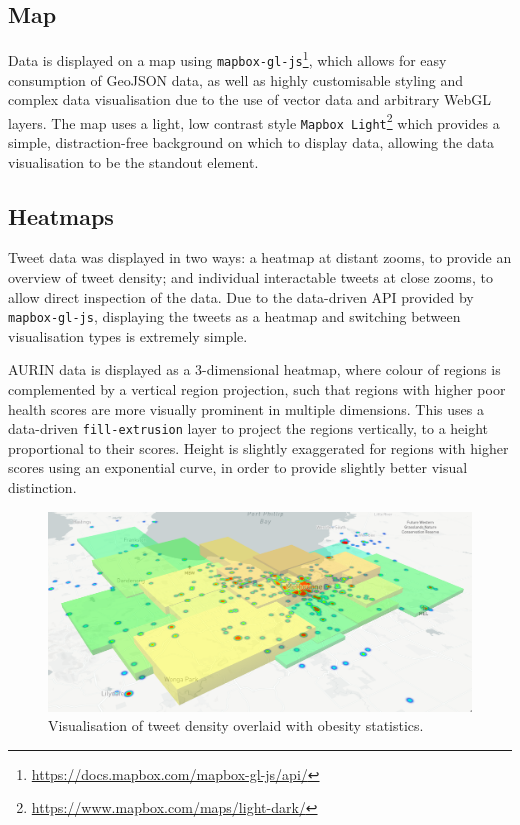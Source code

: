 \subsection{Map}

Data is displayed on a map using \texttt{mapbox-gl-js}\footnote{\url{https://docs.mapbox.com/mapbox-gl-js/api/}}, which allows for easy consumption of GeoJSON data, as well as highly customisable styling and complex data visualisation due to the use of vector data and arbitrary WebGL layers. The map uses a light, low contrast style \texttt{Mapbox Light}\footnote{\url{https://www.mapbox.com/maps/light-dark/}} which provides a simple, distraction-free background on which to display data, allowing the data visualisation to be the standout element.

\subsection{Heatmaps}

Tweet data was displayed in two ways: a heatmap at distant zooms, to provide an overview of tweet density; and individual interactable tweets at close zooms, to allow direct inspection of the data. Due to the data-driven API provided by \texttt{mapbox-gl-js}, displaying the tweets as a heatmap and switching between visualisation types is extremely simple.

AURIN data is displayed as a 3-dimensional heatmap, where colour of regions is complemented by a vertical region projection, such that regions with higher poor health scores are more visually prominent in multiple dimensions. This uses a data-driven \texttt{fill-extrusion} layer to project the regions vertically, to a height proportional to their scores. Height is slightly exaggerated for regions with higher scores using an exponential curve, in order to provide slightly better visual distinction.

\begin{figure}[H]
    \centering
    \includegraphics[width=12cm,keepaspectratio=true]{images/heatmap_visualisation.png}
    \caption{Visualisation of tweet density overlaid with obesity statistics.}
    \label{fig:visheatmap}
\end{figure}

